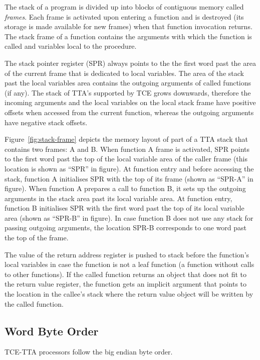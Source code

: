 \documentclass[twoside]{tceusermanual}
\begin{document}
The stack of a program is divided up into blocks of contiguous memory called
\emph{frames}. Each frame is activated upon entering a function and is
destroyed (its storage is made available for new frames) when that function
invocation returns. The stack frame of a function contains the arguments
with which the function is called and variables local to the procedure.

The stack pointer register (SPR) always points to the the first word past
the area of the current frame that is dedicated to local variables.  The
area of the stack past the local variables area contains the outgoing
arguments of called functions (if any).  The stack of TTA's supported by TCE
grows downwards, therefore the incoming arguments and the local variables on
the local stack frame have positive offsets when accessed from the current
function, whereas the outgoing arguments have negative stack offsets.

Figure~\ref{fig:stack-frame} depicts the memory layout of part of a TTA
stack that contains two frames: A and B.  When function A frame is
activated, SPR points to the first word past the top of the local variable
area of the caller frame (this location is shown as ``SPR'' in figure).  At
function entry and before accessing the stack, function A initialises SPR
with the top of its frame (shown as ``SPR-A'' in figure).  When function A
prepares a call to function B, it sets up the outgoing arguments in the
stack area past its local variable area.  At function entry, function B
initialises SPR with the first word past the top of its local variable area
(shown as ``SPR-B'' in figure).  In case function B does not use any stack
for passing outgoing arguments, the location SPR-B corresponds to one word
past the top of the frame.

The value of the return address register is pushed to stack before the 
function's local variables in case the function is not a leaf function
(a function without calls to other functions). If the called function returns 
an object that does not fit to the return value register, the function 
gets an implicit argument that points to the location in the callee's 
stack where the return value object will be written by the called function. 

\subsection{Word Byte Order}
\label{ssec:word-order}

TCE-TTA processors follow the big endian byte order.
\end{document}
